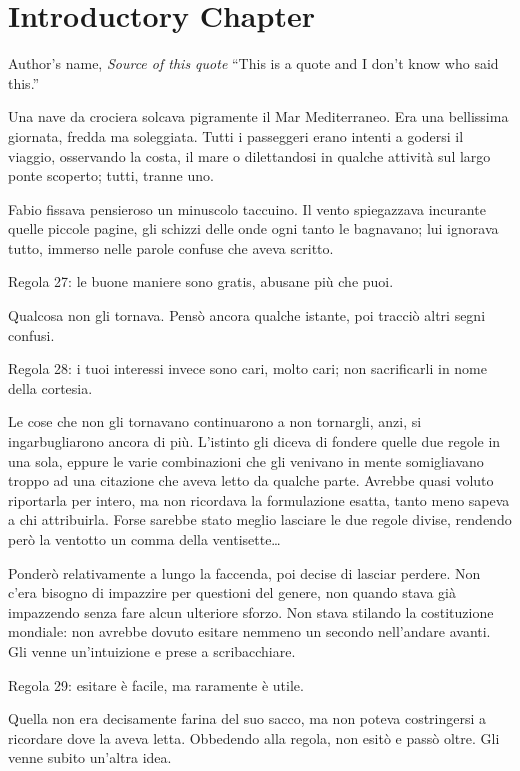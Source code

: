 \chapter{Introductory Chapter}

\begin{chapquote}{Author's name, \textit{Source of this quote}}
``This is a quote and I don't know who said this.''
\end{chapquote}

Una nave da crociera solcava pigramente il Mar Mediterraneo. Era una bellissima giornata, fredda ma soleggiata. Tutti i passeggeri erano intenti a godersi il viaggio, osservando la costa, il mare o dilettandosi in qualche attività sul largo ponte scoperto; tutti, tranne uno.

Fabio fissava pensieroso un minuscolo taccuino. Il vento spiegazzava incurante quelle piccole pagine, gli schizzi delle onde ogni tanto le bagnavano; lui ignorava tutto, immerso nelle parole confuse che aveva scritto.

Regola 27: le buone maniere sono gratis, abusane più che puoi.

Qualcosa non gli tornava. Pensò ancora qualche istante, poi tracciò altri segni confusi.

Regola 28: i tuoi interessi invece sono cari, molto cari; non sacrificarli in nome della cortesia.

Le cose che non gli tornavano continuarono a non tornargli, anzi, si ingarbugliarono ancora di più. L'istinto gli diceva di fondere quelle due regole in una sola, eppure le varie combinazioni che gli venivano in mente somigliavano troppo ad una citazione che aveva letto da qualche parte. Avrebbe quasi voluto riportarla per intero, ma non ricordava la formulazione esatta, tanto meno sapeva a chi attribuirla. Forse sarebbe stato meglio lasciare le due regole divise, rendendo però la ventotto un comma della ventisette\ldots

Ponderò relativamente a lungo la faccenda, poi decise di lasciar perdere. Non c'era bisogno di impazzire per questioni del genere, non quando stava già impazzendo senza fare alcun ulteriore sforzo. Non stava stilando la costituzione mondiale: non avrebbe dovuto esitare nemmeno un secondo nell'andare avanti. Gli venne un'intuizione e prese a scribacchiare.

Regola 29: esitare è facile, ma raramente è utile.

Quella non era decisamente farina del suo sacco, ma non poteva costringersi a ricordare dove la aveva letta. Obbedendo alla regola, non esitò e passò oltre. Gli venne subito un'altra idea.

